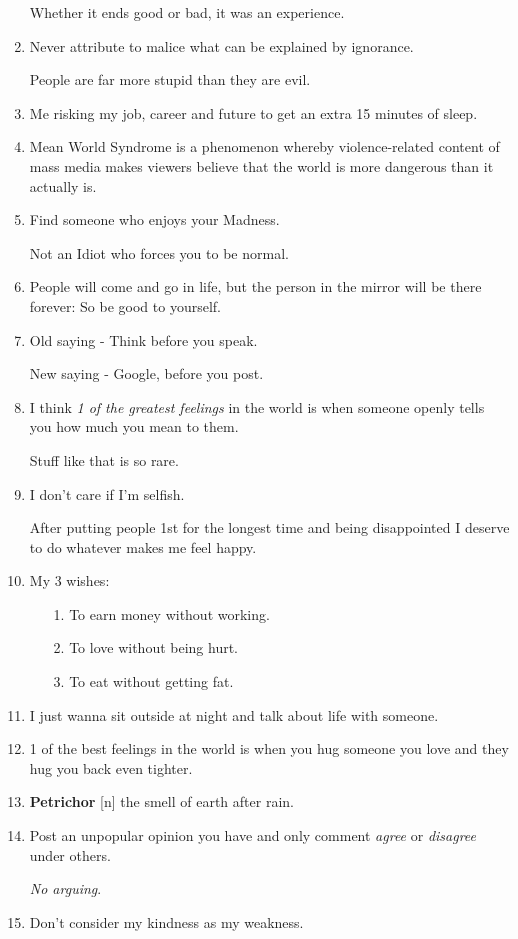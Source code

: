 \documentclass{article}
\begin{document}
\begin{enumerate}
	Whether it ends good or bad, it was an experience.
	\item Never attribute to malice what can be explained by ignorance.
	
	People are far more stupid than they are evil.
	\item Me risking my job, career and future to get an extra 15 minutes of sleep.
	\item Mean World Syndrome is a phenomenon whereby violence-related content of mass media makes viewers believe that the world is more dangerous than it actually is.
	\item Find someone who enjoys your Madness.
	
	Not an Idiot who forces you to be normal.
	\item People will come and go in life, but the person in the mirror will be there forever: So be good to yourself.
	\item Old saying - Think before you speak.
	
	New saying - Google, before you post.
	\item I think \textit{1 of the greatest feelings} in the world is when someone openly tells you how much you mean to them.
	
	Stuff like that is so rare.
	\item I don't care if I'm selfish.
	
	After putting people 1st for the longest time and being disappointed I deserve to do whatever makes me feel happy.
	\item My 3 wishes:
	\begin{itemize}
		\item[1.] To earn money without working.
		\item[2.] To love without being hurt.
		\item[3.] To eat without getting fat.
	\end{itemize}
	\item I just wanna sit outside at night and talk about life with someone.
	\item 1 of the best feelings in the world is when you hug someone you love and they hug you back even tighter.
	\item \textbf{Petrichor} [n] the smell of earth after rain.
	\item Post an unpopular opinion you have and only comment \textit{agree} or \textit{disagree} under others.
	
	\textit{No arguing}.
	\item Don't consider my kindness as my weakness.
	

\end{enumerate}
\end{document}
